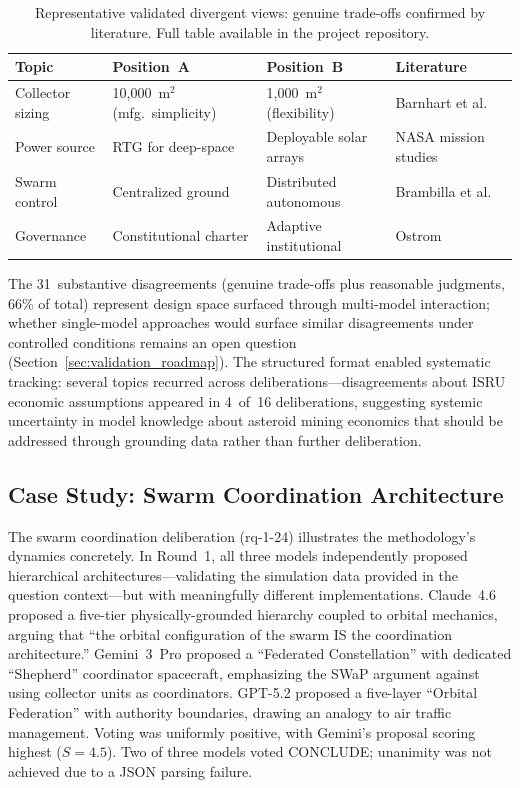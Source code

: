 \documentclass[11pt,a4paper]{article}
\begin{document}
\begin{table}[ht]
\centering
\caption{Representative validated divergent views: genuine trade-offs confirmed by literature. Full table available in the project repository.}
\label{tab:validated_divergent}
\begin{tabular}{@{}p{2.2cm}p{3.2cm}p{3.2cm}p{4cm}@{}}
\toprule
\textbf{Topic} & \textbf{Position~A} & \textbf{Position~B} & \textbf{Literature} \\
\midrule
Collector sizing & 10{,}000~m$^2$ (mfg.\ simplicity) & 1{,}000~m$^2$ (flexibility) & Barnhart et al.~\cite{barnhart2007smallsat} \\
Power source & RTG for deep-space & Deployable solar arrays & NASA mission studies~\cite{nasa2020se} \\
Swarm control & Centralized ground & Distributed autonomous & Brambilla et al.~\cite{brambilla2013swarm} \\
Governance & Constitutional charter & Adaptive institutional & Ostrom~\cite{ostrom1990governing} \\
\bottomrule
\end{tabular}
\end{table}

The 31~substantive disagreements (genuine trade-offs plus reasonable judgments, 66\% of total) represent design space surfaced through multi-model interaction; whether single-model approaches would surface similar disagreements under controlled conditions remains an open question (Section~\ref{sec:validation_roadmap}). The structured format enabled systematic tracking: several topics recurred across deliberations---disagreements about ISRU economic assumptions appeared in 4~of~16 deliberations, suggesting systemic uncertainty in model knowledge about asteroid mining economics that should be addressed through grounding data rather than further deliberation.

\subsection{Case Study: Swarm Coordination Architecture}

The swarm coordination deliberation (rq-1-24) illustrates the methodology's dynamics concretely. In Round~1, all three models independently proposed hierarchical architectures---validating the simulation data provided in the question context---but with meaningfully different implementations. Claude~4.6 proposed a five-tier physically-grounded hierarchy coupled to orbital mechanics, arguing that ``the orbital configuration of the swarm IS the coordination architecture.'' Gemini~3~Pro proposed a ``Federated Constellation'' with dedicated ``Shepherd'' coordinator spacecraft, emphasizing the SWaP argument against using collector units as coordinators. GPT-5.2 proposed a five-layer ``Orbital Federation'' with authority boundaries, drawing an analogy to air traffic management. Voting was uniformly positive, with Gemini's proposal scoring highest ($S = 4.5$). Two of three models voted CONCLUDE; unanimity was not achieved due to a JSON parsing failure.
\end{document}
